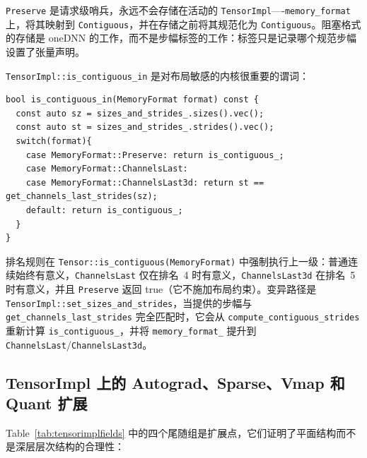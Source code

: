 \texttt{Preserve} 是请求级哨兵，永远不会存储在活动的 \texttt{TensorImpl}----\texttt{memory\_format} 上，将其映射到 \texttt{Contiguous}，并在存储之前将其规范化为 \texttt{Contiguous}。阻塞格式的存储是 oneDNN 的工作，而不是步幅标签的工作：标签只是记录哪个规范步幅设置了张量声明。

\texttt{TensorImpl::is\_contiguous\_in} 是对布局敏感的内核很重要的谓词：

\begin{lstlisting}[caption={contiguity-in-format via exact stride compare.}, label=lst:iscontigin]
bool is_contiguous_in(MemoryFormat format) const {
  const auto sz = sizes_and_strides_.sizes().vec();
  const auto st = sizes_and_strides_.strides().vec();
  switch(format){
    case MemoryFormat::Preserve: return is_contiguous_;
    case MemoryFormat::ChannelsLast:
    case MemoryFormat::ChannelsLast3d: return st == get_channels_last_strides(sz);
    default: return is_contiguous_;
  }
}
\end{lstlisting}

排名规则在 \texttt{Tensor::is\_contiguous(MemoryFormat)} 中强制执行上一级：普通连续始终有意义，\texttt{ChannelsLast} 仅在排名~4 时有意义，\texttt{ChannelsLast3d} 在排名~5 时有意义，并且 \texttt{Preserve} 返回 true（它不施加布局约束）。变异路径是 \texttt{TensorImpl::set\_sizes\_and\_strides}，当提供的步幅与 \texttt{get\_channels\_last\_strides} 完全匹配时，它会从 \texttt{compute\_contiguous\_strides} 重新计算 \texttt{is\_contiguous\_}，并将 \texttt{memory\_format\_} 提升到 \texttt{ChannelsLast}/\texttt{ChannelsLast3d}。

\subsection{TensorImpl 上的 Autograd、Sparse、Vmap 和 Quant 扩展}
\label{sec:extensions}

Table~\ref{tab:tensorimplfields} 中的四个尾随组是扩展点，它们证明了平面结构而不是深层层次结构的合理性：

